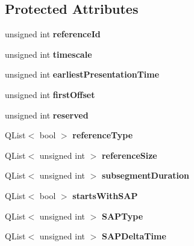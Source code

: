 \subsection*{Protected Attributes}
\begin{DoxyCompactItemize}
\item 
\hypertarget{class_segment_index_box_a0963f84fc30389b80f9ebb26817d63d8}{unsigned int {\bfseries reference\-Id}}\label{class_segment_index_box_a0963f84fc30389b80f9ebb26817d63d8}

\item 
\hypertarget{class_segment_index_box_a3974d6740bd45c49b4554ab283bf2ecd}{unsigned int {\bfseries timescale}}\label{class_segment_index_box_a3974d6740bd45c49b4554ab283bf2ecd}

\item 
\hypertarget{class_segment_index_box_a04c9dc73776d1c98760d9639e3822d80}{unsigned int {\bfseries earliest\-Presentation\-Time}}\label{class_segment_index_box_a04c9dc73776d1c98760d9639e3822d80}

\item 
\hypertarget{class_segment_index_box_a8f15411864a9df60f4ea52420301167d}{unsigned int {\bfseries first\-Offset}}\label{class_segment_index_box_a8f15411864a9df60f4ea52420301167d}

\item 
\hypertarget{class_segment_index_box_a8f2607ac8bc9fd7aabf350c5c44a10e2}{unsigned int {\bfseries reserved}}\label{class_segment_index_box_a8f2607ac8bc9fd7aabf350c5c44a10e2}

\item 
\hypertarget{class_segment_index_box_a6bf3a005a600219128dd5dbd4761a672}{Q\-List$<$ bool $>$ {\bfseries reference\-Type}}\label{class_segment_index_box_a6bf3a005a600219128dd5dbd4761a672}

\item 
\hypertarget{class_segment_index_box_a3e061e64a898b9b1f4c37a17070a4882}{Q\-List$<$ unsigned int $>$ {\bfseries reference\-Size}}\label{class_segment_index_box_a3e061e64a898b9b1f4c37a17070a4882}

\item 
\hypertarget{class_segment_index_box_a9bcf5bbff094390ae114ea08c316471b}{Q\-List$<$ unsigned int $>$ {\bfseries subsegment\-Duration}}\label{class_segment_index_box_a9bcf5bbff094390ae114ea08c316471b}

\item 
\hypertarget{class_segment_index_box_a82d278589542fe8b8c8da790efafe8cb}{Q\-List$<$ bool $>$ {\bfseries starts\-With\-S\-A\-P}}\label{class_segment_index_box_a82d278589542fe8b8c8da790efafe8cb}

\item 
\hypertarget{class_segment_index_box_a0965d40813a151c9378b68dde5d1b0a3}{Q\-List$<$ unsigned int $>$ {\bfseries S\-A\-P\-Type}}\label{class_segment_index_box_a0965d40813a151c9378b68dde5d1b0a3}

\item 
\hypertarget{class_segment_index_box_aee83c9ddbef3c4741a555a9fdf35b2dd}{Q\-List$<$ unsigned int $>$ {\bfseries S\-A\-P\-Delta\-Time}}\label{class_segment_index_box_aee83c9ddbef3c4741a555a9fdf35b2dd}

\end{DoxyCompactItemize}


